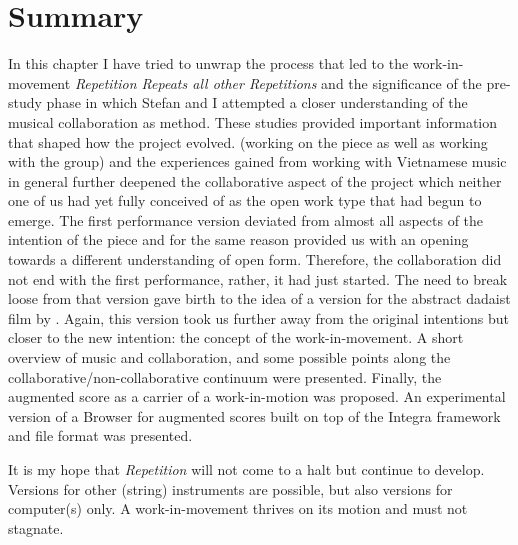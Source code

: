 \section{Summary}
\label{sec:summary-2}

In this chapter I have tried to unwrap the process that led to the work-in-movement \emph{Repetition Repeats all other Repetitions} and the significance of the pre-study phase in which Stefan and I attempted a closer understanding of the musical collaboration as method. These studies provided important information that shaped how the project evolved.  (working on the piece as well as working with the group) and the experiences gained from working with Vietnamese music in general further deepened the collaborative aspect of the project which neither one of us had yet fully conceived of as the open work type that had begun to emerge. The first performance version deviated from almost all aspects of the intention of the piece and for the same reason provided us with an opening towards a different understanding of open form. Therefore, the collaboration did not end with the first performance, rather, it had just started. The need to break loose from that version gave birth to the idea of a version for the abstract dadaist film  by \citeauthor{eggeling24}. Again, this version took us further away from the original intentions but closer to the new intention: the concept of the work-in-movement. A short overview of music and collaboration, and some possible points along the collaborative/non-collaborative continuum were presented. Finally, the augmented score as a carrier of a work-in-motion was proposed. An experimental version of a Browser for augmented scores built on top of the Integra framework and file format was presented. 

It is my hope that \emph{Repetition} will not come to a halt but continue to develop. Versions for other (string) instruments are possible, but also versions for computer(s) only. A work-in-movement thrives on its motion and must not stagnate.
\newpage
\thispagestyle{empty}
